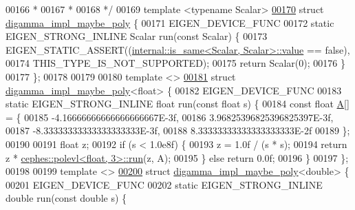 \begin{DoxyCode}
00166 \textcolor{comment}{ *}
00167 \textcolor{comment}{ *}
00168 \textcolor{comment}{ */}
00169 \textcolor{keyword}{template} <\textcolor{keyword}{typename} Scalar>
\hyperlink{struct_eigen_1_1internal_1_1digamma__impl__maybe__poly}{00170} \textcolor{keyword}{struct }\hyperlink{struct_eigen_1_1internal_1_1digamma__impl__maybe__poly}{digamma\_impl\_maybe\_poly} \{
00171   EIGEN\_DEVICE\_FUNC
00172   \textcolor{keyword}{static} EIGEN\_STRONG\_INLINE Scalar run(\textcolor{keyword}{const} Scalar) \{
00173     EIGEN\_STATIC\_ASSERT((\hyperlink{struct_eigen_1_1internal_1_1is__same}{internal::is\_same<Scalar, Scalar>::value} 
      == \textcolor{keyword}{false}),
00174                         THIS\_TYPE\_IS\_NOT\_SUPPORTED);
00175     \textcolor{keywordflow}{return} Scalar(0);
00176   \}
00177 \};
00178 
00179 
00180 \textcolor{keyword}{template} <>
\hyperlink{struct_eigen_1_1internal_1_1digamma__impl__maybe__poly_3_01float_01_4}{00181} \textcolor{keyword}{struct }\hyperlink{struct_eigen_1_1internal_1_1digamma__impl__maybe__poly}{digamma\_impl\_maybe\_poly}<float> \{
00182   EIGEN\_DEVICE\_FUNC
00183   \textcolor{keyword}{static} EIGEN\_STRONG\_INLINE \textcolor{keywordtype}{float} run(\textcolor{keyword}{const} \textcolor{keywordtype}{float} s) \{
00184     \textcolor{keyword}{const} \textcolor{keywordtype}{float} \hyperlink{group___core___module_class_eigen_1_1_matrix}{A}[] = \{
00185       -4.16666666666666666667E-3f,
00186       3.96825396825396825397E-3f,
00187       -8.33333333333333333333E-3f,
00188       8.33333333333333333333E-2f
00189     \};
00190 
00191     \textcolor{keywordtype}{float} z;
00192     \textcolor{keywordflow}{if} (s < 1.0e8f) \{
00193       z = 1.0f / (s * s);
00194       \textcolor{keywordflow}{return} z * \hyperlink{struct_eigen_1_1internal_1_1cephes_1_1polevl}{cephes::polevl<float, 3>::run}(z, A);
00195     \} \textcolor{keywordflow}{else} \textcolor{keywordflow}{return} 0.0f;
00196   \}
00197 \};
00198 
00199 \textcolor{keyword}{template} <>
\hyperlink{struct_eigen_1_1internal_1_1digamma__impl__maybe__poly_3_01double_01_4}{00200} \textcolor{keyword}{struct }\hyperlink{struct_eigen_1_1internal_1_1digamma__impl__maybe__poly}{digamma\_impl\_maybe\_poly}<double> \{
00201   EIGEN\_DEVICE\_FUNC
00202   \textcolor{keyword}{static} EIGEN\_STRONG\_INLINE \textcolor{keywordtype}{double} run(\textcolor{keyword}{const} \textcolor{keywordtype}{double} s) \{

\end{DoxyCode}
